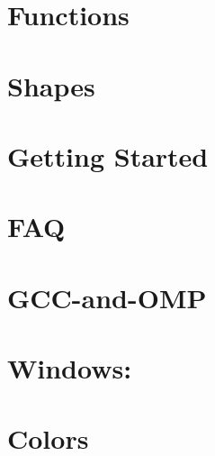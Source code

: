 \documentclass[twoside]{book}
\newcommand{\+}{\discretionary{\mbox{\scriptsize$\hookleftarrow$}}{}{}}
\begin{document}
\chapter{Functions}
\label{md__home_pretzel_workspace_tsgl__t_s_g_l_docs-src_tutorials_functions}
\hypertarget{md__home_pretzel_workspace_tsgl__t_s_g_l_docs-src_tutorials_functions}{}

\chapter{Shapes}
\label{md__home_pretzel_workspace_tsgl__t_s_g_l_docs-src_tutorials_shapes}
\hypertarget{md__home_pretzel_workspace_tsgl__t_s_g_l_docs-src_tutorials_shapes}{}

\chapter{Getting Started}
\label{md__home_pretzel_workspace_tsgl__t_s_g_l_docs-src_tutorials_started}
\hypertarget{md__home_pretzel_workspace_tsgl__t_s_g_l_docs-src_tutorials_started}{}

\chapter{F\+A\+Q}
\label{md__home_pretzel_workspace_tsgl__t_s_g_l_docs-wiki__f_a_q}
\hypertarget{md__home_pretzel_workspace_tsgl__t_s_g_l_docs-wiki__f_a_q}{}

\chapter{G\+C\+C-\/and-\/\+O\+M\+P}
\label{md__home_pretzel_workspace_tsgl__t_s_g_l_docs-wiki__g_c_c-and-_o_m_p}
\hypertarget{md__home_pretzel_workspace_tsgl__t_s_g_l_docs-wiki__g_c_c-and-_o_m_p}{}

\chapter{Windows\+:}
\label{md__home_pretzel_workspace_tsgl__t_s_g_l_docs-wiki__library-_versions}
\hypertarget{md__home_pretzel_workspace_tsgl__t_s_g_l_docs-wiki__library-_versions}{}

\chapter{Colors}
\label{md__home_pretzel_workspace_tsgl__t_s_g_l_docs-wiki_tutorials__tutorial---_colors}
\hypertarget{md__home_pretzel_workspace_tsgl__t_s_g_l_docs-wiki_tutorials__tutorial---_colors}{}

\end{document}
